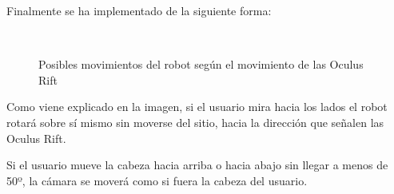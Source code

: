\documentclass[twoside, 12pt]{epstfg}
\begin{document}
Finalmente se ha implementado de la siguiente forma:


\begin{figure}[width= .80\textwidth]
	\centering
	\\
	\caption{Posibles movimientos del robot según el movimiento de las Oculus Rift} \label{movRobot}
\end{figure}

Como viene explicado en la imagen, si el usuario mira hacia los lados el robot rotará sobre sí mismo sin moverse del sitio, hacia la dirección que señalen las Oculus Rift.

Si el usuario mueve la cabeza hacia arriba o hacia abajo sin llegar a menos de 50º, la cámara se moverá como si fuera la cabeza del usuario.
\end{document}
